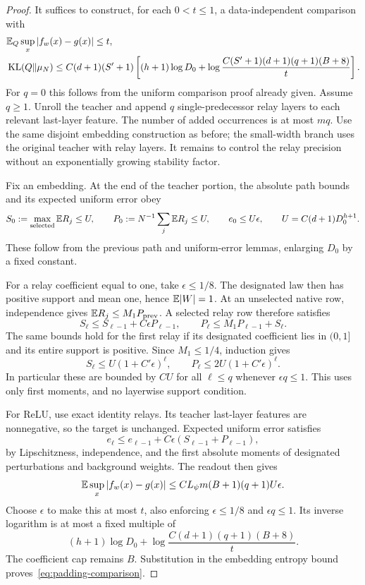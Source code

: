 \begin{proof}
It suffices to construct, for each $0<t\le1$, a data-independent comparison with
\begin{align}
 &\mathbb E_Q\sup_x|f_w(x)-g(x)|\le t,\nonumber\\
 &\operatorname{KL}(Q\|\mu_N)\le C(d+1)(S'+1)
 \left[(h+1)\log D_0+
 \log\frac{C(S'+1)(d+1)(q+1)(B+8)}t\right].
 \label{eq:padding-comparison}
\end{align}
For $q=0$ this follows from the uniform comparison proof already given.
Assume $q\ge1$. Unroll the teacher and append $q$ single-predecessor relay layers to each relevant last-layer feature. The number of added occurrences is at most $mq$. Use the same disjoint embedding construction as before; the small-width branch uses the original teacher with relay layers. It remains to control the relay precision without an exponentially growing stability factor.

Fix an embedding. At the end of the teacher portion, the absolute path bounds and its expected uniform error obey
\[
 S_0:=\max_{\rm selected}\mathbb E R_j\le U,\qquad
 P_0:=N^{-1}\sum_j\mathbb E R_j\le U,\qquad
 e_0\le U\epsilon,\qquad
 U=C(d+1)D_0^{h+1}.
\]
These follow from the previous path and uniform-error lemmas, enlarging $D_0$ by a fixed constant.

For a relay coefficient equal to one, take $\epsilon\le1/8$.
The designated law then has positive support and mean one, hence
$\mathbb E|W|=1$. At an unselected native row, independence gives
$\mathbb E R_j\le M_1P_{\rm prev}$. A selected relay row therefore satisfies
\begin{equation}
 S_\ell\le S_{\ell-1}+C\epsilon P_{\ell-1},\qquad
 P_\ell\le M_1P_{\ell-1}+S_\ell.
 \label{eq:relay-first-moments}
\end{equation}
The same bounds hold for the first relay if its designated coefficient lies in $(0,1]$ and its entire support is positive. Since $M_1\le1/4$, induction gives
\[
 S_\ell\le U(1+C'\epsilon)^\ell,\qquad
 P_\ell\le2U(1+C'\epsilon)^\ell.
\]
In particular these are bounded by $C U$ for all $\ell\le q$ whenever
$\epsilon q\le1$. This uses only first moments, and no layerwise support condition.

For ReLU, use exact identity relays. Its teacher last-layer features are nonnegative, so the target is unchanged. Expected uniform error satisfies
\[
 e_\ell\le e_{\ell-1}
    +C\epsilon(S_{\ell-1}+P_{\ell-1}),
\]
by Lipschitzness, independence, and the first absolute moments of designated perturbations and background weights. The readout then gives
\[
 \mathbb E\sup_x|f_w(x)-g(x)|
 \le C L_\psi m(B+1)(q+1)U\epsilon.
\]
Choose $\epsilon$ to make this at most $t$, also enforcing
$\epsilon\le1/8$ and $\epsilon q\le1$. Its inverse logarithm is at most a fixed multiple of
\[
 (h+1)\log D_0+\log\frac{C(d+1)(q+1)(B+8)}t.
\]
The coefficient cap remains $B$. Substitution in the embedding entropy bound proves~\eqref{eq:padding-comparison}.


\end{proof}
